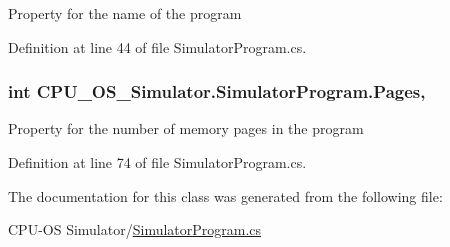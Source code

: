 Property for the name of the program 



Definition at line 44 of file Simulator\+Program.\+cs.

\hypertarget{class_c_p_u___o_s___simulator_1_1_simulator_program_acb651f746bd98040b6b7a06637b83fa3}{}
\subsubsection[{Pages}]{\setlength{\rightskip}{0pt plus 5cm}int C\+P\+U\+\_\+\+O\+S\+\_\+\+Simulator.\+Simulator\+Program.\+Pages\hspace{0.3cm}{\ttfamily [get]}, {\ttfamily [set]}}\label{class_c_p_u___o_s___simulator_1_1_simulator_program_acb651f746bd98040b6b7a06637b83fa3}


Property for the number of memory pages in the program 



Definition at line 74 of file Simulator\+Program.\+cs.



The documentation for this class was generated from the following file\+:\begin{DoxyCompactItemize}
\item 
C\+P\+U-\/\+O\+S Simulator/\hyperlink{_simulator_program_8cs}{Simulator\+Program.\+cs}\end{DoxyCompactItemize}
